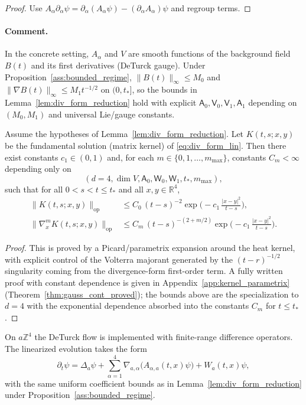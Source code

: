\begin{proof}
Use $A_\alpha\partial_\alpha\psi=\partial_\alpha(A_\alpha\psi)-(\partial_\alpha A_\alpha)\psi$ and regroup terms.
\end{proof}

\paragraph{Comment.}
In the concrete setting, $A_\alpha$ and $V$ are smooth functions of the background field $B(t)$ and its first derivatives
(DeTurck gauge).
Under Proposition~\ref{ass:bounded_regime}, $\|B(t)\|_\infty\le M_0$ and $\|\nabla B(t)\|_\infty\le M_1 t^{-1/2}$ on $(0,t_\ast]$,
so the bounds in Lemma~\ref{lem:div_form_reduction} hold with explicit $\mathsf A_0,\mathsf V_0,\mathsf V_1,\mathsf A_1$
depending on $(M_0,M_1)$ and universal Lie/gauge constants.

\begin{theorem}\label{thm:gauss_continuum_parametrix}
Assume the hypotheses of Lemma~\ref{lem:div_form_reduction}.
Let $K(t,s;x,y)$ be the fundamental solution (matrix kernel) of \eqref{eq:div_form_lin}.
Then there exist constants $c_1\in(0,1)$ and, for each $m\in\{0,1,\dots,m_{\max}\}$, constants $C_m<\infty$ depending only on
\[
(d=4,\dim V,\mathsf A_0,\mathsf W_0,\mathsf W_1,t_\ast,m_{\max}),
\]
such that for all $0<s<t\le t_\ast$ and all $x,y\in\mathbb R^4$,
\begin{align}
\|K(t,s;x,y)\|_{\mathrm{op}}
&\le
C_0\,(t-s)^{-2}\exp\!\Big(-c_1\,\frac{|x-y|^2}{t-s}\Big),\\
\|\nabla_x^m K(t,s;x,y)\|_{\mathrm{op}}
&\le
C_m\,(t-s)^{-(2+m/2)}\exp\!\Big(-c_1\,\frac{|x-y|^2}{t-s}\Big).
\end{align}
\end{theorem}

\begin{proof}
This is proved by a Picard/parametrix expansion around the heat kernel, with explicit control of the Volterra majorant generated by
the $(t-r)^{-1/2}$ singularity coming from the divergence-form first-order term.
A fully written proof with constant dependence is given in Appendix~\ref{app:kernel_parametrix}
(Theorem~\ref{thm:gauss_cont_proved}); the bounds above are the specialization to $d=4$ with the exponential dependence
absorbed into the constants $C_m$ for $t\le t_\ast$.
\end{proof}

On $a\mathbb Z^4$ the DeTurck flow is implemented with finite-range difference operators.
The linearized evolution takes the form
\[
\partial_t\psi
=
\Delta_a\psi+\sum_{\alpha=1}^4\nabla_{a,\alpha}\big(A_{\alpha,a}(t,x)\psi\big)+W_a(t,x)\psi,
\]
with the same uniform coefficient bounds as in Lemma~\ref{lem:div_form_reduction} under Proposition~\ref{ass:bounded_regime}.

